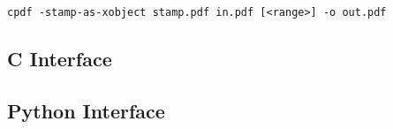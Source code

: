 \documentclass{book}
\begin{document}
\begin{framed}
  \noindent\small\verb!cpdf -stamp-as-xobject stamp.pdf in.pdf [<range>] -o out.pdf!
\end{framed}

\begin{cpdflib}
\clearpage
\section*{C Interface}
\begin{small}\tt

\end{small}
\end{cpdflib}

\begin{pycpdflib}
\clearpage
\section*{Python Interface}
\begin{small}\tt

\end{small}
\end{pycpdflib}
\end{document}
